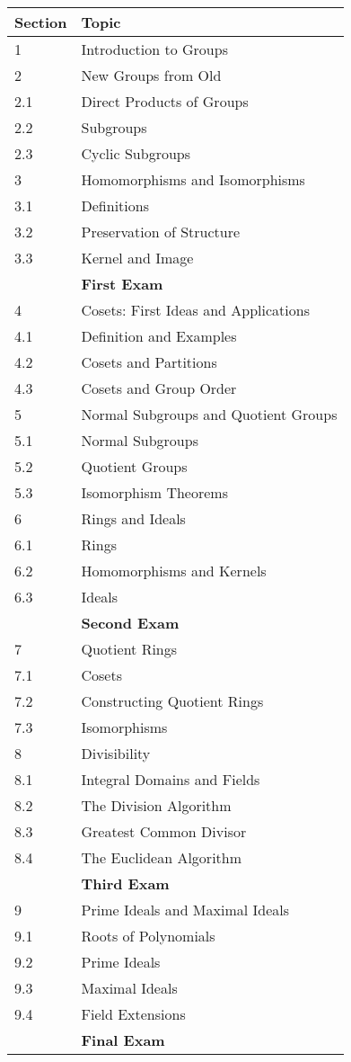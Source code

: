 \documentclass[
  twoside]{article}
\begin{document}
\begin{description}
  { \renewcommand{\arraystretch}{1.1}
\begin{tabular}{||l|l||}
\hline
\textbf{Section} & \textbf{Topic} \\
\hline\hline
 1 & Introduction to Groups \\ \hline
 2 & New Groups from Old \\ \hline
 2.1 & Direct Products of Groups \\ \hline
 2.2 & Subgroups \\ \hline
 2.3 & Cyclic Subgroups \\ \hline
 3 & Homomorphisms and Isomorphisms \\ \hline
 3.1 & Definitions \\ \hline
 3.2 & Preservation of Structure \\ \hline
 3.3 & Kernel and Image \\ \hline
  & \textbf{First Exam} \\ \hline
 4 & Cosets: First Ideas and Applications \\ \hline
 4.1 & Definition and Examples \\ \hline
 4.2 & Cosets and Partitions \\ \hline
 4.3 & Cosets and Group Order \\ \hline
 5 & Normal Subgroups and Quotient Groups \\ \hline
 5.1 & Normal Subgroups \\ \hline
 5.2 & Quotient Groups \\ \hline
 5.3 & Isomorphism Theorems \\ \hline
 6 & Rings and Ideals \\ \hline
 6.1 & Rings \\ \hline
 6.2 & Homomorphisms and Kernels \\ \hline
 6.3 & Ideals \\ \hline
  & \textbf{Second Exam} \\ \hline
 7 & Quotient Rings \\ \hline
 7.1 & Cosets \\ \hline
 7.2 & Constructing Quotient Rings \\ \hline
 7.3 & Isomorphisms \\ \hline
 8 & Divisibility \\ \hline
 8.1 & Integral Domains and Fields \\ \hline
 8.2 & The Division Algorithm \\ \hline
 8.3 & Greatest Common Divisor \\ \hline
 8.4 & The Euclidean Algorithm \\ \hline
  & \textbf{Third Exam} \\ \hline
 9 & Prime Ideals and Maximal Ideals \\ \hline
 9.1 & Roots of Polynomials \\ \hline
 9.2 & Prime Ideals \\ \hline
 9.3 & Maximal Ideals \\ \hline
 9.4 & Field Extensions \\ \hline
  & \textbf{Final Exam} \\ \hline
\end{tabular}
}


\end{description}
\end{document}

